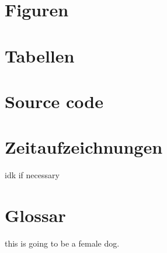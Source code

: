 \documentclass[letterpaper, 12pt]{article}
\begin{document}
\parindent 0pt
\parskip 6pt



\clearpage
\tableofcontents
\clearpage



 
\clearpage
{}
\pagestyle{fancy}







\clearpage
\begingroup


\endgroup

\clearpage
\begin{appendices}
	\section{Figuren}
		\makeatletter
		\makeatother
	\section{Tabellen}
		\makeatletter
		\makeatother
	\section{Source code}
		\makeatletter
		\makeatother
	\section{Zeitaufzeichnungen}
		\todo idk if necessary
	\section{Glossar}
		\todo this is going to be a female dog.
\end{appendices}
\end{document}
